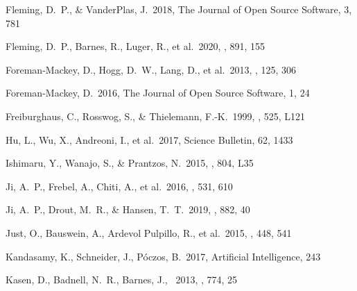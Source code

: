 \documentclass[twocolumn]{aastex63}
\begin{document}
\begin{thebibliography}{}

 Fleming, D.~P., \& VanderPlas, J.\ 2018, The Journal of Open Source Software, 3, 781

 Fleming, D.~P., Barnes, R., Luger, R., et al.\ 2020, \apj, 891, 155

 Foreman-Mackey, D., Hogg, D.~W., Lang, D., et al.\ 2013, \pasp, 125, 306

 Foreman-Mackey, D.\ 2016, The Journal of Open Source Software, 1, 24




 Freiburghaus, C., Rosswog, S., \& Thielemann, F.-K.\ 1999, \apjl, 525, L121


 Hu, L., Wu, X., Andreoni, I., et al.\ 2017, Science Bulletin, 62, 1433

 Ishimaru, Y., Wanajo, S., \& Prantzos, N.\ 2015, \apjl, 804, L35

 Ji, A.~P., Frebel, A., Chiti, A., et al.\ 2016, \nat, 531, 610

 Ji, A.~P., Drout, M.~R., \& Hansen, T.~T.\ 2019, \apj, 882, 40

 Just, O., Bauswein, A., Ardevol Pulpillo, R., et al.\ 2015, \mnras, 448, 541

 Kandasamy, K., Schneider, J., P{\'o}czos, B.\ 2017, Artificial Intelligence, 243

Kasen, D., Badnell, N.~R., Barnes, J., \ 2013, \aj, 774, 25


\end{thebibliography}
\end{document}
